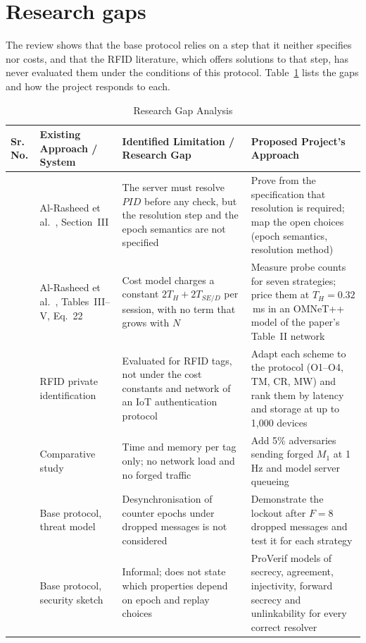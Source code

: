\section{Research gaps}\label{sec:gaps}
The review shows that the base protocol relies on a step that it neither specifies nor costs, and that the RFID literature, which offers solutions to that step, has never evaluated them under the conditions of this protocol. Table~\ref{tab:gaps} lists the gaps and how the project responds to each.

\begin{table}[H]
\centering
\caption{Research Gap Analysis}
\label{tab:gaps}
\small
\renewcommand{\arraystretch}{1.2}
\begin{tabularx}{\textwidth}{|>{\centering\arraybackslash}p{}|>{\raggedright\arraybackslash}p{}|>{\raggedright\arraybackslash}X|>{\raggedright\arraybackslash}X|}
\hline
\textbf{Sr. No.} & \textbf{Existing Approach / System} & \textbf{Identified Limitation / Research Gap} & \textbf{Proposed Project's Approach}\\ \hline
1 & Al-Rasheed et al.~\cite{base}, Section~III & The server must resolve $PID$ before any check, but the resolution step and the epoch semantics are not specified & Prove from the specification that resolution is required; map the open choices (epoch semantics, resolution method)\\ \hline
2 & Al-Rasheed et al.~\cite{base}, Tables~III--V, Eq.~22 & Cost model charges a constant $2T_H+2T_{SE/D}$ per session, with no term that grows with $N$ & Measure probe counts for seven strategies; price them at $T_H=0.32$\,ms in an OMNeT++ model of the paper's Table~II network\\ \hline
3 & RFID private identification~\cite{weis,ohkubo,molnar,avoine05,tsudik} & Evaluated for RFID tags, not under the cost constants and network of an IoT authentication protocol & Adapt each scheme to the protocol (O1--O4, TM, CR, MW) and rank them by latency and storage at up to 1,000 devices\\ \hline
4 & Comparative study~\cite{ado05} & Time and memory per tag only; no network load and no forged traffic & Add 5\% adversaries sending forged $M_1$ at 1\,Hz and model server queueing\\ \hline
5 & Base protocol, threat model & Desynchronisation of counter epochs under dropped messages is not considered & Demonstrate the lockout after $F=8$ dropped messages and test it for each strategy\\ \hline
6 & Base protocol, security sketch & Informal; does not state which properties depend on epoch and replay choices & ProVerif models of secrecy, agreement, injectivity, forward secrecy and unlinkability for every correct resolver\\ \hline
\end{tabularx}
\end{table}

